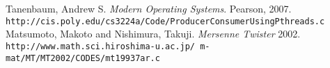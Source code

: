 \documentclass[letterpaper,10pt,fleqn]{article}
\begin{document}
\begin{thebibliography}{9}
Tanenbaum, Andrew S.
\textit{Modern Operating Systems}. 
Pearson, 2007.
\\\texttt{http://cis.poly.edu/cs3224a/Code/ProducerConsumerUsingPthreads.c}
Matsumoto, Makoto and Nishimura, Takuji.
\textit{Mersenne Twister}
2002.
\\\texttt{http://www.math.sci.hiroshima-u.ac.jp/~m-mat/MT/MT2002/CODES/mt19937ar.c}
\end{thebibliography}
\end{document}
